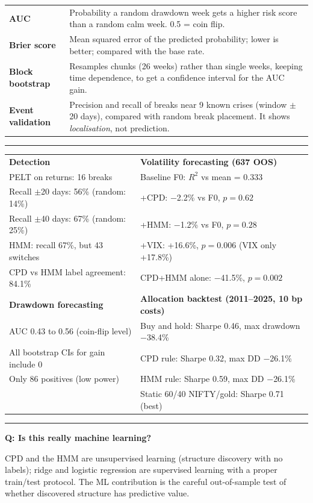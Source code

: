 \documentclass[10pt]{article}
\newcommand{\h}[1]{\vspace{4pt}{\large\bfseries #1}\par\vspace{1pt}\hrule\vspace{3pt}}
\newcommand{\q}[1]{\par\vspace{2pt}\textbf{Q: #1}\par\vspace{-3pt}}
\begin{document}
\begin{tabular}{@{}p{1.55in}p{5.4in}@{}}
\textbf{AUC} & Probability a random drawdown week gets a higher risk score than a random calm week. 0.5 = coin flip.\\
\textbf{Brier score} & Mean squared error of the predicted probability; lower is better; compared with the base rate.\\
\textbf{Block bootstrap} & Resamples chunks (26 weeks) rather than single weeks, keeping time dependence, to get a confidence interval for the AUC gain.\\
\textbf{Event validation} & Precision and recall of breaks near 9 known crises (window $\pm$20 days), compared with random break placement. It shows \emph{localisation}, not prediction.\\\bottomrule
\end{tabular}

\h{6. Numbers to memorise}
\begin{tabular}{@{}p{3.1in}p{3.7in}@{}}
\textbf{Detection} & \textbf{Volatility forecasting (637 OOS)}\\
PELT on returns: 16 breaks & Baseline F0: $R^2$ vs mean = 0.333\\
Recall $\pm$20 days: 56\% (random: 14\%) & +CPD: $-$2.2\% vs F0, $p=0.62$\\
Recall $\pm$40 days: 67\% (random: 25\%) & +HMM: $-$1.2\% vs F0, $p=0.28$\\
HMM: recall 67\%, but 43 switches & +VIX: +16.6\%, $p=0.006$ (VIX only +17.8\%)\\
CPD vs HMM label agreement: 84.1\% & CPD+HMM alone: $-$41.5\%, $p=0.002$\\[4pt]
\textbf{Drawdown forecasting} & \textbf{Allocation backtest (2011--2025, 10 bp costs)}\\
AUC 0.43 to 0.56 (coin-flip level) & Buy and hold: Sharpe 0.46, max drawdown $-$38.4\%\\
All bootstrap CIs for gain include 0 & CPD rule: Sharpe 0.32, max DD $-$26.1\%\\
Only 86 positives (low power) & HMM rule: Sharpe 0.59, max DD $-$26.1\%\\
 & Static 60/40 NIFTY/gold: Sharpe 0.71 (best)\\
\end{tabular}

\h{7. Likely questions and short answers}
\q{Is this really machine learning?}
CPD and the HMM are unsupervised learning (structure discovery with no labels); ridge and logistic regression are supervised learning with a proper train/test protocol. The ML contribution is the careful out-of-sample test of whether discovered structure has predictive value.
\end{document}
